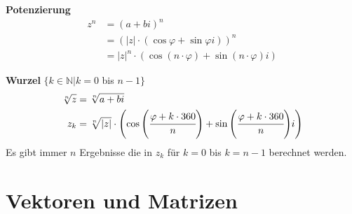 \documentclass[german]{latex4ei/latex4ei_sheet}
\begin{document}
\begin{sectionbox}
\textbf{Potenzierung}
\begin{align*}
{ z }^{ n } &={ \left( a+bi \right)  }^{ n } \\
&={ \left( \left| z \right| \cdot \left( \cos { \varphi  } +\sin { \varphi  } i \right)  \right)  }^{ n } \\
&={ \left| z \right|  }^{ n }\cdot \left( \cos { \left( n\cdot \varphi  \right)  } +\sin { \left( n\cdot \varphi  \right)  } i \right)
\end{align*}

\textbf{Wurzel} $\lbrace k \in \mathbb{N}  \vert k = 0$ bis $n-1 \rbrace$
\begin{align*}
\sqrt[n]{z} &= \sqrt[n]{ a+bi } \\
{ z }_{ k } &= \sqrt[n]{\vert z \vert} \cdot \left( \cos{ \left( \cfrac{ \varphi + k \cdot 360}{n} \right) } +\sin{\left( \cfrac{\varphi + k \cdot 360}{n} \right)} i \right) 
\end{align*}
Es gibt immer $n$ Ergebnisse die in ${ z }_{ k } $ für $k= 0$ bis $k= n-1$ berechnet werden.

\end{sectionbox}

\section{Vektoren und Matrizen}
\end{document}
